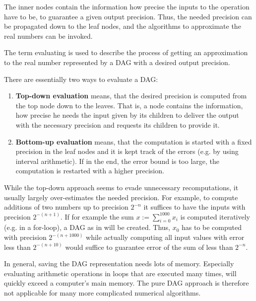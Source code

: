     The inner nodes contain the information how precise the inputs to the
    operation have to be, to guarantee a given output precision.
    Thus, the needed precision can be propagated down to the leaf nodes, and
    the algorithms to approximate the real numbers can be invoked.

	  The term evaluating is used to describe the process of getting an approximation
    to the real number represented by a DAG with a desired output  precision.

		There are essentially two ways to evaluate a DAG:
		\begin{enumerate}
			\item \textbf{Top-down evaluation} means, that the desired precision is computed from the top node down to the leaves.
			That is, a node contains the information, how precise he needs the input given by its children to deliver the output with the necessary precision and requests its children to provide it.  
			\item \textbf{Bottom-up evaluation} means, that the computation is started with a fixed precision in the leaf nodes 
			and it is kept track of the errors (e.g. by using interval arithmetic). 
			If in the end, the error bound is too large, the computation is restarted with a higher precision. 
		\end{enumerate}
		While the top-down approach seems to evade unnecessary recomputations, it
    usually largely over-estimates the needed precision.
    For example, to compute additions of two numbers up to precision $2^{-n}$
    it suffices to have the inputs with precision $2^{-(n+1)}$.
    If for example the sum $x := \sum_{i=0}^1000 x_i$ is computed iteratively (e.g. in a
    for-loop), a DAG as in  will be created. 
    Thus, $x_0$ has to be computed with precision $2^{-(n+1000)}$ while actually
    computing all input values with error less than $2^{-(n+10)}$ would 
    suffice to guarantee error of the sum of less than $2^{-n}$.

    In general, saving the DAG representation needs lots of memory. 
    Especially evaluating arithmetic operations in loops that are executed many
    times, will quickly exceed a computer's main memory.
    The pure DAG approach is therefore not applicable for many more complicated
    numerical algorithms.
